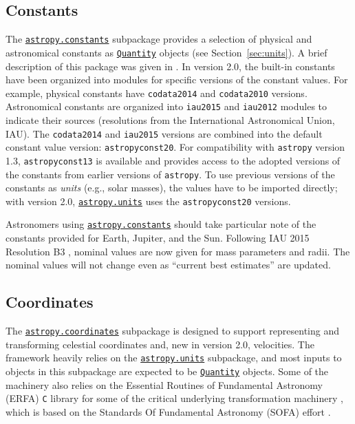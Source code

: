 \documentclass[modern]{aastex62}
\newcommand{\package}[1]{\texttt{#1}\xspace}
\newcommand{\astropypkg}{\package{astropy}}
\newcommand{\sectionname}{Section\xspace}
\newcommand{\astropysubpkg}[1]{\href{http://docs.astropy.org/en/stable/#1/index.html}{\texttt{astropy.#1}}\xspace}
\newcommand{\astropyQuantity}{\href{http://docs.astropy.org/en/stable/api/astropy.units.Quantity.html}{\texttt{Quantity}}\xspace}
\begin{document}
\subsection{Constants}

The \astropysubpkg{constants} subpackage provides a selection of physical and
astronomical constants as \astropyQuantity objects (see
\sectionname~\ref{sec:units}).
A brief description of this package was given in \cite{astropy}.
In version 2.0, the built-in constants have been organized into modules for
specific versions of the constant values.
For example, physical constants have \texttt{codata2014} \citep{codata2014} and
\texttt{codata2010} versions.
Astronomical constants are organized into \texttt{iau2015} and \texttt{iau2012}
modules to indicate their sources (resolutions from the International
Astronomical Union, IAU).
The \texttt{codata2014} and \texttt{iau2015} versions are combined into the
default constant value version: \texttt{astropyconst20}.
For compatibility with \astropypkg version 1.3,  \texttt{astropyconst13}
is available and provides access to the adopted versions of the
constants from earlier versions of \astropypkg.
To use previous versions of the constants as \emph{units} (e.g., solar masses),
the values have to be imported directly; with version
2.0, \astropysubpkg{units} uses the \texttt{astropyconst20} versions.

Astronomers using \astropysubpkg{constants} should take particular note of the
constants provided for Earth, Jupiter, and the Sun.
Following IAU 2015 Resolution B3 \citep{iau2015b3}, nominal values are now given
for mass parameters and radii.
The nominal values will not change even as ``current best estimates'' are
updated.

\subsection{Coordinates}
\label{sec:coordinates}
The \astropysubpkg{coordinates} subpackage is designed to support representing
and transforming celestial coordinates and, new in version 2.0, velocities.
The framework heavily relies on the \astropysubpkg{units} subpackage, and most
inputs to objects in this subpackage are expected to be \astropyQuantity
objects.
Some of the machinery also relies on the Essential Routines of Fundamental
Astronomy (ERFA) \texttt{C} library for some of the critical underlying
transformation machinery \citep{erfa}, which is based on the Standards Of
Fundamental Astronomy (SOFA) effort \citep{sofa}.
\end{document}
